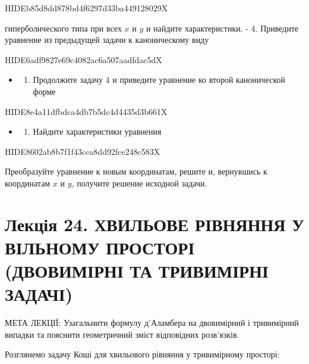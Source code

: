 \documentclass[
  ukrainian,
]{article}
\providecommand{\tightlist}{%
  \setlength{\itemsep}{0pt}\setlength{\parskip}{0pt}}
\begin{document}
HIDEb85d8dd878bd4f6297d33ba449128029X

гиперболического типа при всех \(x\) и \(y\) и найдите характеристики. -
4. Приведите уравнение из предыдущей задачи к каноническому виду

HIDE6adf9827e69c4082ac6a507aadfdac5dX

\begin{itemize}
\tightlist
\item
  \begin{enumerate}
  \def\labelenumi{\arabic{enumi}.}
  \setcounter{enumi}{4}
  \tightlist
  \item
    Продолжите задачу 4 и приведите уравнение ко второй канонической
    форме
  \end{enumerate}
\end{itemize}

HIDE8e4a11dfbdca4db7b5dc4d4435d3b661X

\begin{itemize}
\tightlist
\item
  \begin{enumerate}
  \def\labelenumi{\arabic{enumi}.}
  \setcounter{enumi}{5}
  \tightlist
  \item
    Найдите характеристики уравнения
  \end{enumerate}
\end{itemize}

HIDE8602ab8b7f1f43cca8dd92fce248c583X

Преобразуйте уравнение к новым координатам, решите и, вернувшись к
координатам \(x\) и \(y\), получите решение исходной задачи.

\section{Лекція 24. ХВИЛЬОВЕ РІВНЯННЯ У ВІЛЬНОМУ ПРОСТОРІ (ДВОВИМІРНІ ТА
ТРИВИМІРНІ
ЗАДАЧІ)}\label{ux43bux435ux43aux446ux456ux44f-24.-ux445ux432ux438ux43bux44cux43eux432ux435-ux440ux456ux432ux43dux44fux43dux43dux44f-ux443-ux432ux456ux43bux44cux43dux43eux43cux443-ux43fux440ux43eux441ux442ux43eux440ux456-ux434ux432ux43eux432ux438ux43cux456ux440ux43dux456-ux442ux430-ux442ux440ux438ux432ux438ux43cux456ux440ux43dux456-ux437ux430ux434ux430ux447ux456}

МЕТА ЛЕКЦІЇ: Узагальнити формулу д'Аламбера на двовимірний і тривимірний
випадки та пояснити геометричний зміст відповідних розв'язків.

Розглянемо задачу Коші для хвильового рівняння у тривимірному просторі:
\end{document}
